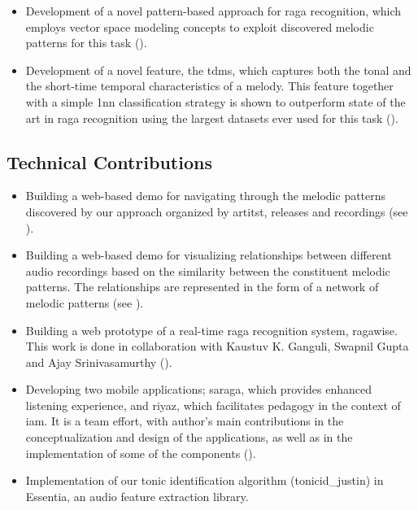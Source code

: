 \begin{itemize}
	\item Development of a novel pattern-based approach for \gls{raga} recognition, which employs vector space modeling concepts to exploit discovered melodic patterns for this task (). 
	
	\item Development of  a novel feature, the \acrfull{tdms}, which captures both the tonal and the short-time temporal characteristics of a melody. This feature together with a simple \gls{1nn} classification strategy is shown to outperform state of the art in \gls{raga} recognition using the largest datasets ever used for this task (). 
	
\end{itemize}

\subsection*{Technical Contributions}

\begin{itemize}
	\item Building a web-based demo for navigating through the melodic patterns discovered by our approach organized by artitst, releases and recordings (see ). 
	\item Building a web-based demo for visualizing relationships between different audio recordings based on the similarity between the constituent melodic patterns. The relationships are represented in the form of a network of melodic patterns (see ).
	\item Building a web prototype of a real-time \gls{raga} recognition system, \gls{ragawise}. This work is done in collaboration with Kaustuv K. Ganguli, Swapnil Gupta and Ajay Srinivasamurthy ().
	\item Developing two mobile applications; \gls{saraga}, which provides enhanced listening experience, and \gls{riyaz}, which facilitates pedagogy in the context of \gls{iam}. It is a team effort, with author's main contributions in the conceptualization and design of the applications, as well as in the implementation of some of the components ().
	\item Implementation of our tonic identification algorithm (\acrshort{tonicid_justin}) in Essentia, an audio feature extraction library.		
\end{itemize}

